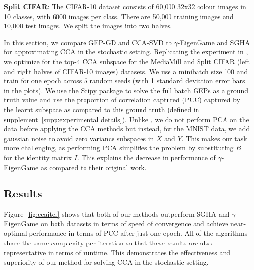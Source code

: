 \textbf{Split CIFAR}: The CIFAR-10 dataset \citep{krizhevsky2009learning} consists of 60,000 32x32 colour images in 10
classes, with 6000 images per class. There are 50,000 training images and 10,000 test images. We split the images into two halves.

In this section, we compare GEP-GD and CCA-SVD to $\gamma$-EigenGame \citep{gemp2022generalized} and SGHA \citep{chen2019constrained} for approximating CCA in the stochastic setting. Replicating the experiment in \citep{meng2021online, gemp2022generalized}, we optimize for the top-4 CCA subspace for the MediaMill and Split CIFAR (left and right halves of CIFAR-10 images) datasets. We use a minibatch size 100 and train for one epoch across 5 random seeds (with 1 standard deviation error bars in the plots). We use the Scipy \citep{virtanen2020scipy} package to solve the full batch GEPs as a ground truth value and use the proportion of correlation captured (PCC) captured by the learnt subspace as compared to this ground truth (defined in supplement~\ref{supp:experimental details}). Unlike \citep{gemp2022generalized}, we do not perform PCA on the data before applying the CCA methods but instead, for the MNIST data, we add gaussian noise to avoid zero variance subspaces in $X$ and $Y$. This makes our task more challenging, as performing PCA simplifies the problem by substituting $B$ for the identity matrix $I$. This explains the decrease in performance of $\gamma$-EigenGame as compared to their original work.


\subsection{Results}

Figure~\ref{fig:ccaiter} shows that both of our methods outperform SGHA and $\gamma$-EigenGame on both datasets in terms of speed of convergence and achieve near-optimal performance in terms of PCC after just one epoch. All of the algorithms share the same complexity per iteration so that these results are also representative in terms of runtime. This demonstrates the effectiveness and superiority of our method for solving CCA in the stochastic setting.

